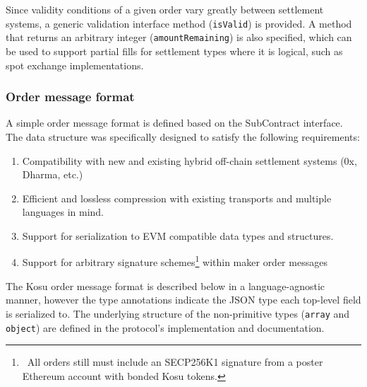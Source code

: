\documentclass[10pt]{article}
\begin{document}
Since validity conditions of a given order vary greatly between settlement systems, a generic validation interface method (\texttt{isValid}) is provided. A method that returns an arbitrary integer (\texttt{amountRemaining}) is also specified, which can be used to support partial fills for settlement types where it is logical, such as spot exchange implementations.

\subsubsection{Order message format}\label{order-message-format}

A simple order message format is defined based on the SubContract interface. The data structure was specifically designed to satisfy the following requirements:

\begin{enumerate}
  \item Compatibility with new and existing hybrid off-chain settlement systems (0x, Dharma, etc.\cite{0x-wp, dharma-wp})
  \item Efficient and lossless compression with existing transports and multiple languages in mind.
  \item Support for serialization to EVM compatible data types and structures.
  \item Support for arbitrary signature schemes\footnote{\ All orders still must include an SECP256K1 signature from a poster Ethereum account with bonded Kosu tokens.} within maker order messages
\end{enumerate}

The Kosu order message format is described below in a language-agnostic manner, however the type annotations indicate the JSON type each top-level field is serialized to. The underlying structure of the non-primitive types (\texttt{array} and \texttt{object}) are defined in the protocol's implementation\cite{kosu-monorepo} and documentation.
\end{document}

